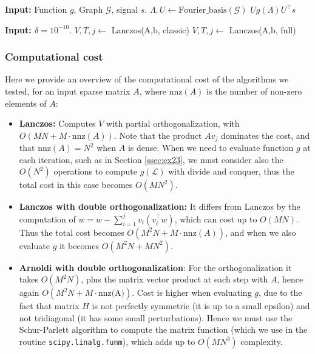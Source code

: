 \documentclass[11pt]{article}
\newcommand{\G}{\mathcal{G}}
\renewcommand{\L}{\mathcal{L}}
\theoremstyle{definition}
\theoremstyle{remark}
\theoremstyle{experimental}
\begin{document}
\begin{algorithm}[ht!]
  \caption{Evaluation of $ g(\L)s $ using Fourier basis.}
  \label{alg:g_evaluation_fourier}
  \begin{algorithmic}
    \State \textbf{Input:} Function $ g $, Graph $ \G $, signal $ s $.
    \State $ \Lambda,U \leftarrow \text{Fourier\_basis}( \G )$
    \State \Return $ U g(\Lambda) U^{\top}s $
  \end{algorithmic}
  
\end{algorithm}

\begin{algorithm}[ht!]
  \caption{Orthogonalization selection.}
  \label{alg:orthosel}
  \begin{algorithmic}
    \State \textbf{Input: $\delta = 10^{-10}$}.
    \State $V, T, j \leftarrow $ Lanczos(A,b, classic)
    \State $ V, T,j \leftarrow $ Lanczos(A,b, full)
      \EndIf
  \end{algorithmic}
\end{algorithm}




\subsubsection{Computational cost}
\label{ssec:cost}

Here we provide an overview of the computational cost of the algorithms we tested, for an input sparse matrix $ A $, where $ \text{nnz}(A) $ is the number of non-zero elements of $ A $:

\begin{itemize}
  \item \textbf{Lanczos:} Computes $ V $  with partial orthogonalization, with $ O(M  N
  + M \cdot \text{nnz}(A)) $. Note that the product $ Av_j $ dominates the cost,
  and that $ \text{nnz}(A) = N^2 $ when $ A $ is dense. When we need to evaluate function $ g $ at
  each iteration, such as in Section \ref{ssec:ex23}, we must consider also the $ O(N^2) $
  operations to compute $ g(\L) $ with divide and conquer, thus the total cost in this case becomes $ O(M N^2) $.
\item \textbf{Lanczos with double orthogonalization:} It differs from Lanczos by the
  computation of $ w = w -
  \sum_{i=1}^j v_i(v_i^{\top}w) $, which can cost up
  to $ O(M N) $. Thus the total cost becomes $ O(M^2N +  M\cdot \text{nnz}(A)) $, and when we
  also evaluate $ g $ it becomes $ O(M^2N + MN^2) $.
\item \textbf{Arnoldi with double orthogonalization}: For the orthogonalization it takes $ O(M^2N)
  $, plus the matrix vector product at each step with $ A $, hence again $ O(M^2N + M \cdot
  \text{nnz(A)}) $. Cost is higher when evaluating $ g $, due to the fact that matrix $ H $ is not
  perfectly symmetric (it is up to a small epsilon) and not tridiagonal (it has some small
  perturbations). Hence we must use the Schur-Parlett algorithm to compute the matrix function
  (which we use in the routine \texttt{scipy.linalg.funm}), which adds up to $ O(M N^3)$ complexity.
 \end{itemize}
\end{document}
